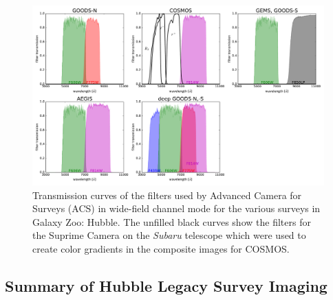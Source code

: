 \documentclass[twocolumn]{aastex6}
\begin{document}
\begin{figure}
\center
\includegraphics[width=160mm]{figures/filter_curves.pdf}
\caption{Transmission curves of the filters used by \hst{} Advanced Camera for Surveys (ACS) in wide-field channel mode for the various surveys in Galaxy Zoo: Hubble. The unfilled black curves show the filters for the Suprime Camera on the \textit{Subaru} telescope which were used to create color gradients in the composite images for COSMOS.\label{fig:filtercurves}}
\end{figure}

\subsection{Summary of Hubble Legacy Survey Imaging}\label{ssec:legacy_surveys}
\end{document}
